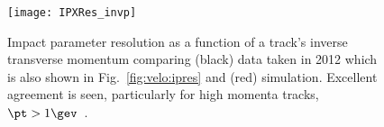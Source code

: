 \begin{figure}
  \begin{center}
    \texttt{[image: IPXRes\_invp]}
    \caption[Impact parameter resolution as a function of inverse transverse momentum comparing
      data and
    simulation]{
      Impact parameter resolution as a function of a track's inverse transverse momentum comparing
      (black)
      data taken in 2012 which is also shown in Fig.~\protect\ref{fig:velo:ipres} and (red)
      simulation.  Excellent agreement is seen, particularly for high momenta tracks,
      $\pt>1\gev$~\protect\cite{LHCb-DP-2014-001}.
    }
    \label{fig:data:ipres}
  \end{center}
\end{figure}





